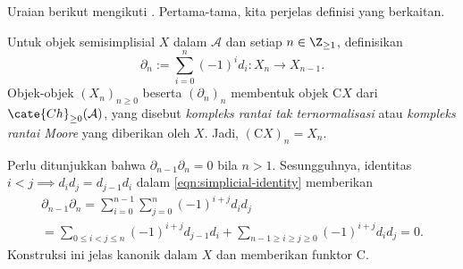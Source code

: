 Uraian berikut mengikuti \cite[\S 1.2]{LuHA}. Pertama-tama, kita perjelas
definisi yang berkaitan.

\begin{definition}\label{def:unnormalized-chain}
	Untuk objek semisimplisial $X$ dalam $\mathcal{A}$ dan setiap
	$n\in\Z_{\geq1}$, definisikan
	\[ \partial_n := \sum_{i=0}^n (-1)^i d_i: X_n \to X_{n-1}. \]
	Objek-objek $(X_n)_{n\geq0}$ beserta $(\partial_n)_n$ membentuk objek
	$\mathrm{C}X$ dari $\cate{Ch}_{\geq0}(\mathcal{A})$, yang disebut
	\emph{kompleks rantai tak ternormalisasi} atau \emph{kompleks rantai
	Moore} yang diberikan oleh $X$. Jadi, $(\mathrm{C}X)_n=X_n$.
\end{definition}

Perlu ditunjukkan bahwa $\partial_{n-1}\partial_n=0$ bila $n>1$.
Sesungguhnya, identitas
$i<j\implies d_id_j=d_{j-1}d_i$ dalam
\eqref{eqn:simplicial-identity} memberikan
\begin{multline*}
	\partial_{n-1} \partial_n = \sum_{i=0}^{n-1} \sum_{j=0}^n (-1)^{i+j} d_i d_j \\
	= \sum_{0 \leq i < j \leq n} (-1)^{i+j} d_{j-1} d_i + \sum_{n-1 \geq i \geq j \geq 0} (-1)^{i+j} d_i d_j = 0.
\end{multline*}
Konstruksi ini jelas kanonik dalam $X$ dan memberikan funktor $\mathrm{C}$.

